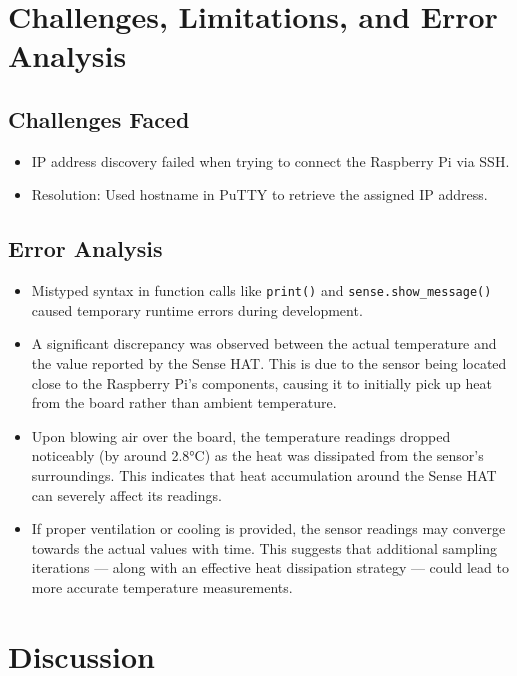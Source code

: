 \documentclass[a4paper,12pt]{article}
\begin{document}
\section{Challenges, Limitations, and Error Analysis}



\subsection{Challenges Faced}
\begin{itemize}
    \item IP address discovery failed when trying to connect the Raspberry Pi via SSH.
    \item Resolution: Used hostname in PuTTY to retrieve the assigned IP address.
\end{itemize}

\subsection{Error Analysis}
\begin{itemize}
    \item Mistyped syntax in function calls like \texttt{print()} and \texttt{sense.show\_message()} caused temporary runtime errors during development.
    
    \item A significant discrepancy was observed between the actual temperature and the value reported by the Sense HAT. This is due to the sensor being located close to the Raspberry Pi's components, causing it to initially pick up heat from the board rather than ambient temperature.

    \item Upon blowing air over the board, the temperature readings dropped noticeably (by around 2.8°C) as the heat was dissipated from the sensor's surroundings. This indicates that heat accumulation around the Sense HAT can severely affect its readings.

    \item If proper ventilation or cooling is provided, the sensor readings may converge towards the actual values with time. This suggests that additional sampling iterations — along with an effective heat dissipation strategy — could lead to more accurate temperature measurements.
\end{itemize}

\section{Discussion}
\end{document}
